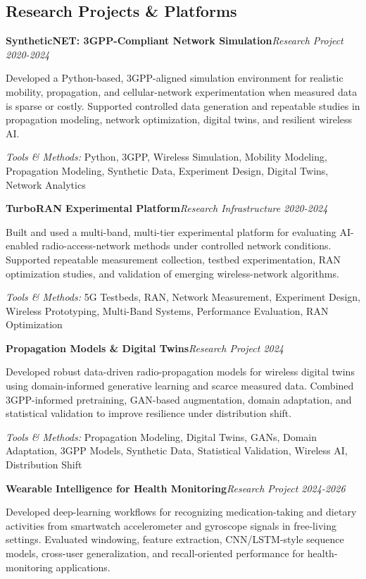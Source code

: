 \documentclass[9pt,letterpaper]{extarticle}
\newcommand{\entry}[2]{\Needspace{4\baselineskip}\textbf{#1}\hfill\textit{#2}\par}
\begin{document}
\subsection{Research Projects \& Platforms}
\entry{SyntheticNET: 3GPP-Compliant Network Simulation}{Research Project \textbar{} 2020-2024}
Developed a Python-based, 3GPP-aligned simulation environment for realistic mobility, propagation, and cellular-network experimentation when measured data is sparse or costly. Supported controlled data generation and repeatable studies in propagation modeling, network optimization, digital twins, and resilient wireless AI.\par
{\small\textit{Tools \& Methods:} Python, 3GPP, Wireless Simulation, Mobility Modeling, Propagation Modeling, Synthetic Data, Experiment Design, Digital Twins, Network Analytics\par}
\vspace{1pt}
\entry{TurboRAN Experimental Platform}{Research Infrastructure \textbar{} 2020-2024}
Built and used a multi-band, multi-tier experimental platform for evaluating AI-enabled radio-access-network methods under controlled network conditions. Supported repeatable measurement collection, testbed experimentation, RAN optimization studies, and validation of emerging wireless-network algorithms.\par
{\small\textit{Tools \& Methods:} 5G Testbeds, RAN, Network Measurement, Experiment Design, Wireless Prototyping, Multi-Band Systems, Performance Evaluation, RAN Optimization\par}
\vspace{1pt}
\entry{Propagation Models \& Digital Twins}{Research Project \textbar{} 2024}
Developed robust data-driven radio-propagation models for wireless digital twins using domain-informed generative learning and scarce measured data. Combined 3GPP-informed pretraining, GAN-based augmentation, domain adaptation, and statistical validation to improve resilience under distribution shift.\par
{\small\textit{Tools \& Methods:} Propagation Modeling, Digital Twins, GANs, Domain Adaptation, 3GPP Models, Synthetic Data, Statistical Validation, Wireless AI, Distribution Shift\par}
\vspace{1pt}
\entry{Wearable Intelligence for Health Monitoring}{Research Project \textbar{} 2024-2026}
Developed deep-learning workflows for recognizing medication-taking and dietary activities from smartwatch accelerometer and gyroscope signals in free-living settings. Evaluated windowing, feature extraction, CNN/LSTM-style sequence models, cross-user generalization, and recall-oriented performance for health-monitoring applications.\par
\end{document}
